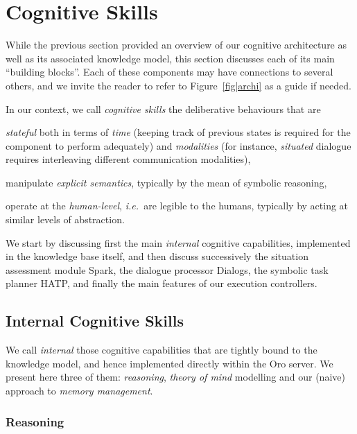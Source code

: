 \documentclass[preprint,3p,times]{elsarticle}
\newcommand{\ie}{{\textit{i.e.\ }}}
\begin{document}
\section{Cognitive Skills}
\label{sec:impl}

While the previous section provided an overview of our cognitive architecture
as well as its associated knowledge model, this section discusses each of its main
``building blocks''. Each of these components may have connections to several
others, and we invite the reader to refer to Figure~\ref{fig|archi} as a guide
if needed.

\begin{inparaenum} In our context, we call \emph{cognitive skills} the
deliberative behaviours that are \item \emph{stateful} both in terms of
\emph{time} (keeping track of previous states is required for the component
to perform adequately) and \emph{modalities} (for instance, \emph{situated}
dialogue requires interleaving different communication modalities), \item
manipulate \emph{explicit semantics}, typically by the mean of symbolic
reasoning, \item operate at the \emph{human-level}, \ie are legible to the
humans, typically by acting at similar levels of abstraction.\end{inparaenum}

We start by discussing first the main \emph{internal} cognitive capabilities,
implemented in the knowledge base itself, and then discuss successively the
situation assessment module {\sc Spark}, the dialogue processor {\sc Dialogs},
the symbolic task planner HATP, and finally the main features of our execution
controllers.

\subsection{Internal Cognitive Skills}
\label{sect|intern}

We call \emph{internal} those cognitive capabilities that are tightly bound to
the knowledge model, and hence implemented directly within the {\sc Oro} server.
We present here three of them: \emph{reasoning}, \emph{theory of mind} modelling
and our (naive) approach to \emph{memory management}.

\subsubsection{Reasoning}
\label{reasoning}
\end{document}
